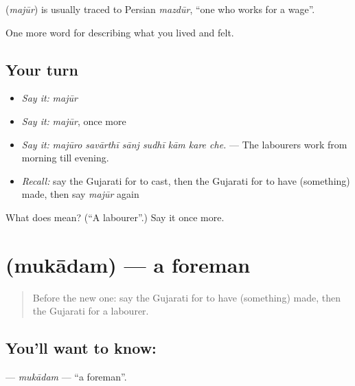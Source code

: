 \begin{cousinweb}
\textbf{} (\emph{majūr}) is usually traced to Persian \emph{mazdūr}, \textquotedblleft{}one who works for a wage\textquotedblright{}.
\end{cousinweb}

\begin{grammarlens}[title={What you've built}]
One more word for describing what you lived and felt.
\end{grammarlens}

\subsection*{Your turn}
\begin{itemize}
\raggedright
  \item \emph{Say it:} \emph{majūr}
  \item \emph{Say it:} \emph{majūr}, once more
  \item \emph{Say it:} \emph{majūro savārthī sānj sudhī kām kare che.} — The labourers work from morning till evening.
  \item \emph{Recall:} say the Gujarati for to cast, then the Gujarati for to have (something) made, then say \emph{majūr} again
\end{itemize}

\begin{tcolorbox}[breakable,colback=teal!4,colframe=teal!35!black,title={Before you move on}]
What does  mean? (\textquotedblleft{}A labourer\textquotedblright{}.) Say it once more.
\end{tcolorbox}
\section[\texorpdfstring{\gu{મુકાદમ} (mukādam)}{મુકાદમ (mukādam)}]{ (mukādam) — a foreman}

\label{lesson:GU-C511-mukadam}



\begin{quote}
Before the new one: say the Gujarati for to have (something) made, then the Gujarati for a labourer.
\end{quote}

\subsection*{You'll want to know: }
\textbf{} — \emph{mukādam} — \textquotedblleft{}a foreman\textquotedblright{}.

